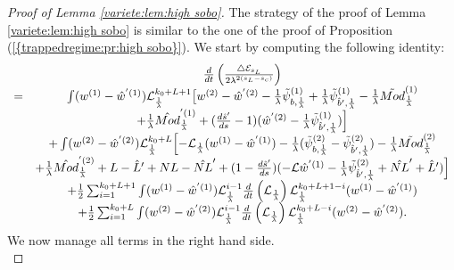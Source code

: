 \documentclass[11pt,a4paper,reqno]{amsart}
\theoremstyle{remark}
\numberwithin{equation}{section}
\begin{document}
\begin{proof}[Proof of Lemma \ref{variete:lem:high sobo}] The strategy of the proof of Lemma \ref{variete:lem:high sobo} is similar to the one of the proof of Proposition {{\rm (\ref{{trappedregime:pr:high sobo}})}}. We start by computing the following identity:
\begin{equation} \label{variete:highsobo:eq:expression generale 1}
\begin{array}{r c l}
&\frac{d}{dt}\left( \frac{\triangle \mathcal{E}_{s_L}}{2\lambda^{2(s_L-s_c)}} \right) \\
=& \int (w^{(1)}-\hat{w}^{'(1)})\mathcal{L}_{\frac{1}{\lambda}}^{k_0+L+1} \bigl{[}w^{(2)}-\hat{w}^{'(2)}-\frac{1}{\lambda}\tilde{\psi}_{b,\frac{1}{\lambda}}^{(1)}+\frac{1}{\lambda}\tilde{\psi}_{\hat{b}',\frac{1}{\lambda}}^{(1)} -\frac{1}{\lambda} \tilde{Mod}_{\frac{1}{\lambda}}^{(1)}\\
&+\frac{1}{\lambda}\hat{Mod}^{'(1)}_{\frac{1}{\lambda}} +(\frac{d\hat{s}'}{ds}-1)(\hat{w}^{'(2)}-\frac{1}{\lambda}\tilde{\psi}^{(1)}_{\hat{b}',\frac{1}{\lambda}}) \Bigr{]}\\
&+\int (w^{(2)}-\hat{w}^{'(2)})\mathcal{L}_{\frac{1}{\lambda}}^{k_0+L} \Bigl{[}-\mathcal{L}_{\frac{1}{\lambda}}(w^{(1)}-\hat{w}^{'(1)})-\frac{1}{\lambda}(\tilde{\psi}_{b,\frac{1}{\lambda}}^{(2)}-\tilde{\psi}_{\hat{b}',\frac{1}{\lambda}}^{(2)}) -\frac{1}{\lambda} \tilde{Mod}_{\frac{1}{\lambda}}^{(2)}\\
&+\frac{1}{\lambda}\hat{Mod}_{\frac{1}{\lambda}}^{'(2)}+L-\hat{L}'+NL-\hat{NL}'+(1-\frac{d\hat{s}'}{ds})(-\mathcal{L}\hat{w}^{'(1)}-\frac{1}{\lambda}\tilde{\psi}_{\hat{b}',\frac{1}{\lambda}}^{(2)}+\hat{NL}'+\hat{L}')  \Bigr{]}\\
&+\frac{1}{2}\sum_{i=1}^{k_0+L+1} \int (w^{(1)}-\hat{w}^{'(1)}) \mathcal{L}_{\frac{1}{\lambda}}^{i-1}\frac{d}{dt}\left( \mathcal{L}_{\frac{1}{\lambda}}\right)\mathcal{L}_{\frac{1}{\lambda}}^{k_0+L+1-i} (w^{(1)}-\hat{w}^{'(1)}) \\
&+\frac{1}{2}\sum_{i=1}^{k_0+L} \int (w^{(2)}-\hat{w}^{'(2)}) \mathcal{L}_{\frac{1}{\lambda}}^{i-1}\frac{d}{dt}\left( \mathcal{L}_{\frac{1}{\lambda}}\right) \mathcal{L}_{\frac{1}{\lambda}}^{k_0+L-i} (w^{(2)}-\hat{w}^{'(2)}) .
\end{array}
\end{equation}
We now manage all terms in the right hand side.\\


\end{proof}
\end{document}
